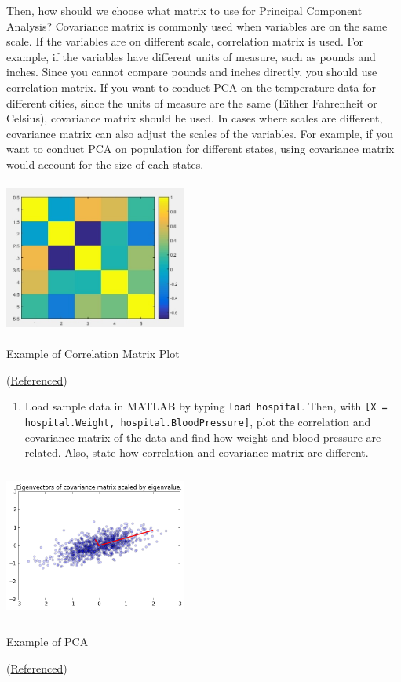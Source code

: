 \documentclass{tufte-handout}
\begin{document}
Then, how should we choose what matrix to use for Principal Component Analysis? Covariance matrix is commonly used when variables are on the same scale. If the variables are on different scale, correlation matrix is used. For example, if the variables have different units of measure, such as pounds and inches. Since you cannot compare pounds and inches directly, you should use correlation matrix. If you want to conduct PCA on the temperature data for different cities, since the units of measure are the same (Either Fahrenheit or Celsius), covariance matrix should be used. In cases where scales are different, covariance matrix can also adjust the scales of the variables. For example, if you want to conduct PCA on population for different states, using covariance matrix would account for the size of each states.

\begin{marginfigure}
    \centering
    \includegraphics[width = 6cm, height = 5cm]{correlation.jpg}
    \label{fig:corr}
\caption{Example of Correlation Matrix Plot}
(\href{https://www.quora.com/Whats-the-best-way-to-visualize-correlations-between-six-value-vectors}{Referenced})


\end{marginfigure}

\begin{enumerate}
	\item Load sample data in MATLAB by typing \verb|load hospital|. Then, with \verb|[X = hospital.Weight, hospital.BloodPressure]|, plot the correlation and covariance matrix of the data and find how weight and blood pressure are related. Also, state how correlation and covariance matrix are different.
\end{enumerate}

\begin{marginfigure}
    \centering
    \includegraphics[width = 6cm, height = 5cm]{PCA.png}
    \label{fig:PCA}
\caption{Example of PCA}
(\href{https://people.duke.edu/~ccc14/sta-663/PCASolutions.html}{Referenced})

\end{marginfigure}
\end{document}
